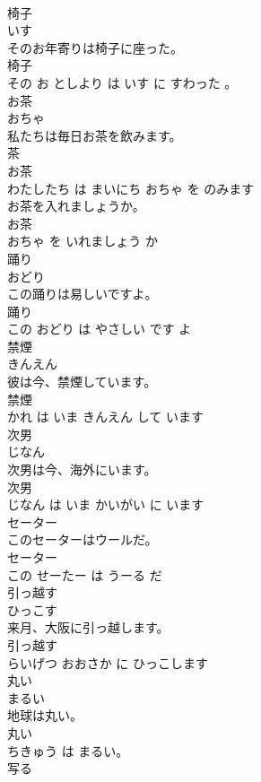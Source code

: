 \documentclass[8pt]{extreport}
\begin{document}
\begin{CJK}{UTF8}{min}
\\	椅子	
\\	いす			
\\	そのお年寄りは椅子に座った。	
\\	椅子 
\\	その お としより は いす に すわった 。			
\\	お茶	
\\	おちゃ			
\\	私たちは毎日お茶を飲みます。	
\\	茶 
\\	お茶 
\\	わたしたち は まいにち おちゃ を のみます			
\\	お茶を入れましょうか。	
\\	お茶 
\\	おちゃ を いれましょう か			
\\	踊り	
\\	おどり			
\\	この踊りは易しいですよ。	
\\	踊り 
\\	この おどり は やさしい です よ			
\\	禁煙	
\\	きんえん			
\\	彼は今、禁煙しています。	
\\	禁煙 
\\	かれ は いま きんえん して います			
\\	次男	
\\	じなん			
\\	次男は今、海外にいます。	
\\	次男 
\\	じなん は いま かいがい に います			
\\	セーター	
\\	このセーターはウールだ。	
\\	セーター 
\\	この せーたー は うーる だ			
\\	引っ越す	
\\	ひっこす			
\\	来月、大阪に引っ越します。	
\\	引っ越す 
\\	らいげつ おおさか に ひっこします			
\\	丸い	
\\	まるい			
\\	地球は丸い。	
\\	丸い 
\\	ちきゅう は まるい。			
\\	写る	

\end{CJK}
\end{document}

